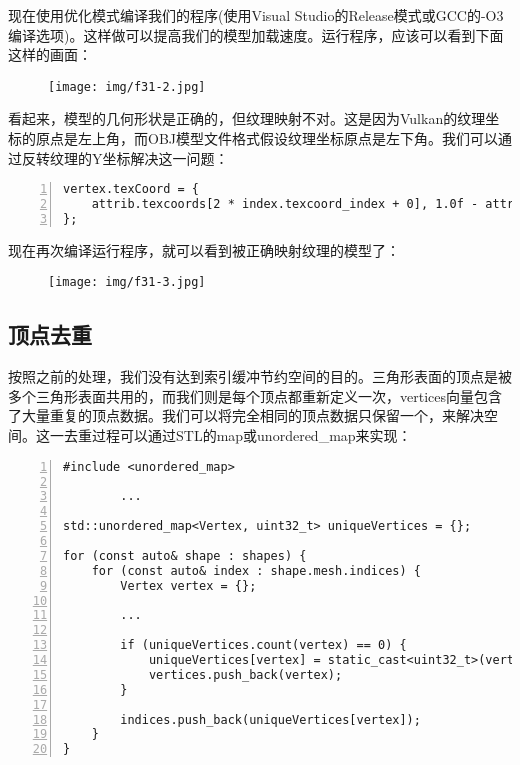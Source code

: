 \documentclass{ctexart}
\begin{document}
现在使用优化模式编译我们的程序(使用Visual Studio的Release模式或GCC的-O3编译选项)。这样做可以提高我们的模型加载速度。运行程序，应该可以看到下面这样的画面：

\begin{figure}[H]
	\centering
	\texttt{[image: img/f31-2.jpg]}
\end{figure}

看起来，模型的几何形状是正确的，但纹理映射不对。这是因为Vulkan的纹理坐标的原点是左上角，而OBJ模型文件格式假设纹理坐标原点是左下角。我们可以通过反转纹理的Y坐标解决这一问题：

\begin{lstlisting}[language={[ANSI]C},keywordstyle=\color{blue!70},commentstyle=\color{red!50!green!50!blue!50},frame=shadowbox, rulesepcolor=\color{red!20!green!20!blue!20},basicstyle=\small,numbers=left, numberstyle=\tiny,breaklines=true]
vertex.texCoord = {
	attrib.texcoords[2 * index.texcoord_index + 0], 1.0f - attrib.texcoords[2 * index.texcoord_index + 1]
};
\end{lstlisting}

现在再次编译运行程序，就可以看到被正确映射纹理的模型了：

\begin{figure}[H]
	\centering
	\texttt{[image: img/f31-3.jpg]}
\end{figure}

\subsection{顶点去重}

按照之前的处理，我们没有达到索引缓冲节约空间的目的。三角形表面的顶点是被多个三角形表面共用的，而我们则是每个顶点都重新定义一次，vertices向量包含了大量重复的顶点数据。我们可以将完全相同的顶点数据只保留一个，来解决空间。这一去重过程可以通过STL的map或unordered\_map来实现：

\begin{lstlisting}[language={[ANSI]C},keywordstyle=\color{blue!70},commentstyle=\color{red!50!green!50!blue!50},frame=shadowbox, rulesepcolor=\color{red!20!green!20!blue!20},basicstyle=\small,numbers=left, numberstyle=\tiny,breaklines=true]
#include <unordered_map>

		...

std::unordered_map<Vertex, uint32_t> uniqueVertices = {};

for (const auto& shape : shapes) {
	for (const auto& index : shape.mesh.indices) {
		Vertex vertex = {};

		...

		if (uniqueVertices.count(vertex) == 0) {
			uniqueVertices[vertex] = static_cast<uint32_t>(vertices.size());
			vertices.push_back(vertex);
		}

		indices.push_back(uniqueVertices[vertex]);
	}
}
\end{lstlisting}
\end{document}
